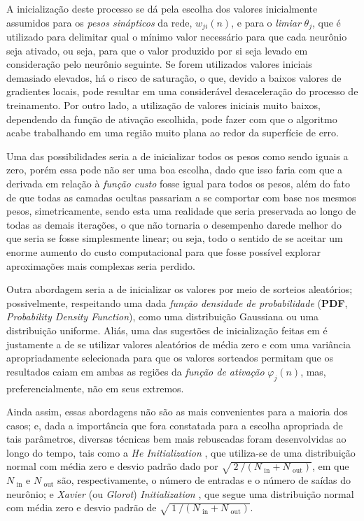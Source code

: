 A inicialização deste processo se dá pela escolha dos valores inicialmente assumidos para os \textit{pesos sinápticos} da rede, $w_{ji}(n)$, e para o \textit{limiar} $\theta_{j}$, que é utilizado para delimitar qual o mínimo valor necessário para que cada neurônio seja ativado, ou seja, para que o valor produzido por si seja levado em consideração pelo neurônio seguinte. Se forem utilizados valores iniciais demasiado elevados, há o risco de saturação, o que, devido a baixos valores de gradientes locais, pode resultar em uma considerável desaceleração do processo de treinamento. Por outro lado, a utilização de valores iniciais muito baixos, dependendo da função de ativação escolhida, pode fazer com que o algoritmo acabe trabalhando em uma região muito plana ao redor da superfície de erro.

Uma das possibilidades seria a de inicializar todos os pesos como sendo iguais a zero, porém essa pode não ser uma boa escolha, dado que isso faria com que a derivada em relação à \textit{função custo} fosse igual para todos os pesos, além do fato de que todas as camadas ocultas passariam a se comportar com base nos mesmos pesos, simetricamente, sendo esta uma realidade que seria preservada ao longo de todas as demais iterações, o que não tornaria o desempenho darede melhor do que seria se fosse simplesmente linear; ou seja, todo o sentido de se aceitar um enorme aumento do custo computacional para que fosse possível explorar aproximações mais complexas seria perdido.

Outra abordagem seria a de inicializar os valores por meio de sorteios aleatórios; possivelmente, respeitando uma dada \textit{função densidade de probabilidade} (\textbf{PDF}, \textit{Probability Density Function}), como uma distribuição Gaussiana ou uma distribuição uniforme. Aliás, uma das sugestões de inicialização feitas em \citep{haykin1999neural} é justamente a de se utilizar valores aleatórios de média zero e com uma variância apropriadamente selecionada para que os valores sorteados permitam que os resultados caiam em ambas as regiões da \textit{função de ativação} $\varphi_{j}(n)$, mas, preferencialmente, não em seus extremos.

Ainda assim, essas abordagens não são as mais convenientes para a maioria dos casos; e, dada a importância que fora constatada para a escolha apropriada de tais parâmetros, diversas técnicas bem mais rebuscadas foram desenvolvidas ao longo do tempo, tais como a \textit{He Initialization} \citep{he2015delving}, que utiliza-se de uma distribuição normal com média zero e desvio padrão dado por $\sqrt{\ 2\ / \left(N_{\text{\ in}} + N_{\text{\ out}}\right)}$, em que $N_{\text{\ in}}$ e $N_{\text{\ out}}$ são, respectivamente, o número de entradas e o número de saídas do neurônio; e \textit{Xavier} (ou \textit{Glorot}) \textit{Initialization} \citep{glorot2010understanding}, que segue uma distribuição normal com média zero e desvio padrão de $\sqrt{\ 1\ / \left(N_{\text{\ in}} + N_{\text{\ out}}\right)}$.